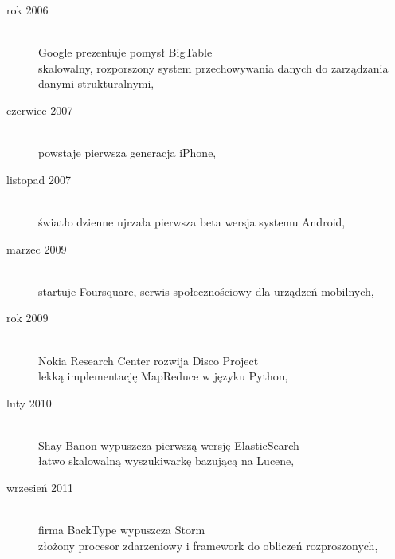 \documentclass[10pt,twocolumn]{llncs}          %
\begin{document}
\begin{description}
    \item[rok 2006] \hfill \\ Google prezentuje pomysł BigTable \hfill \\ skalowalny, rozporszony system przechowywania danych do zarządzania danymi strukturalnymi,
    \item[czerwiec 2007] \hfill \\ powstaje pierwsza generacja iPhone,
    \item[listopad 2007] \hfill \\ światło dzienne ujrzała pierwsza beta wersja systemu Android,
    \item[marzec 2009] \hfill \\ startuje Foursquare, serwis społecznościowy dla urządzeń mobilnych,
    \item[rok 2009] \hfill \\ Nokia Research Center rozwija Disco Project \hfill \\ lekką implementację MapReduce w języku Python,
    \item[luty 2010] \hfill \\ Shay Banon wypuszcza pierwszą wersję ElasticSearch \hfill \\ łatwo skalowalną wyszukiwarkę bazującą na Lucene,
    \item[wrzesień 2011] \hfill \\ firma BackType wypuszcza Storm \hfill \\ złożony procesor zdarzeniowy i framework do obliczeń rozproszonych,
\end{description}
\end{document}
